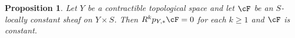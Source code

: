\documentclass[english]{smfart}
\numberwithin{subsection}{section}
\newcommand{\bR}{\boldsymbol{R}}
\DeclareMathOperator{\id}{Id}\let\Id\id
\let\geq\geqslant
\numberwithin{equation}{section}
\theoremstyle{plain}
\newtheorem{proposition}[equation]{Proposition}
\theoremstyle{definition}
\def\to{\mathchoice{\longrightarrow}{\rightarrow}{\rightarrow}{\rightarrow}}
\begin{document}
\begin{comment}
\begin{proof}
Let $g:Y\to X$ be such that $f\circ g$ is homotopic to $\id_Y$ and $g\circ f$ is homotopic to $\id_X$. From Proposition \ref{prop:varphi} we get an isomorphism $\varphi:(f\circ g)^{-1}\cF\to\cF$ and a commutative diagram
\[
\xymatrix{
\bR p_{X,*}f^{-1}\cF\ar[r]^-\psi&\bR p_{X,*}\bR g_*g^{-1}f^{-1}\cF=\bR p_{Y,*}g^{-1}f^{-1}\cF\ar[d]^-{\bR p_{Y,*}\varphi}_-\wr\\
\bR p_{Y,*}\cF\ar[u]^-{\eta}\ar[ur]\ar@{=}[r]&\bR p_{Y,*}\cF
}
\]
Hence, $\psi\circ\eta$ is an isomorphism, so at the cohomology level $\eta$ is injective and $\psi$ is onto. For an $S$-locally constant sheaf $\cG$ on $X$ we have a similar diagram
\[
\xymatrix{
\bR p_{Y,*}g^{-1}\cG\ar[r]&\bR p_{X,*}f^{-1}g^{-1}\cG\\
\bR p_{X,*}\cG\ar[u]\ar[ur]^-\sim&
}
\]
so the vertical morphism is injective at the cohomology level. For $\cG=f^{-1}\cF$, this is nothing but $\psi$, so $\psi$ is injective at the cohomology level. It follows that $\psi$, hence~$\eta$, is bijective at the cohomology level.
\end{proof}
\end{comment}

\begin{proposition}\label{prop:contractible}
Let $Y$ be a contractible topological space and let $\cF$ be an $S$-locally constant sheaf on $Y\times S$. Then $R^kp_{Y,*}\cF=0$ for each $k\geq1$ and $\cF$ is constant.
\end{proposition}
\end{document}
